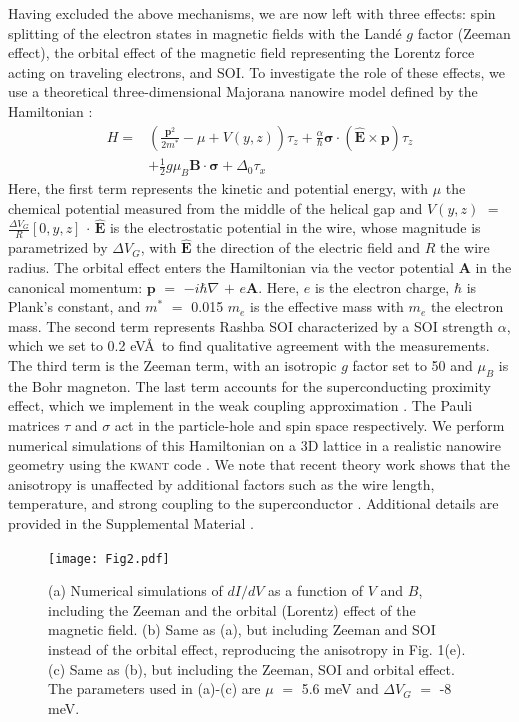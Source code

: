 Having excluded the above mechanisms, we are now left with three effects: spin splitting of the electron \mbox{states} in magnetic fields with the Land\'e $g$ factor (Zeeman eff\mbox{ect)}, the orbital effect of the magnetic field representing the Lorentz force acting on traveling electrons, and SOI.
To investigate the role of these effects, we use a theoretical three-dimensional Majorana nanowire model defined by the Hamiltonian \cite{Lutchyn2010,Oreg2010,Nijholt2016}:
\begin{equation*}
\begin{split}
H = &\left(\frac{\mathbf{p}^2}{2m^*}-\mu+V(y,z)\right) \tau_z + \frac{\alpha}{\hbar} \boldsymbol{\sigma} \cdot \mathbf{(\hat{E}\times p)} \tau_z\\
&+ \frac{1}{2}g\mu_B\mathbf{B\cdot}\boldsymbol{\sigma}+\Delta_0 \tau_x
\end{split}
\end{equation*}
Here, the first term represents the kinetic and potential energy, with $\mu$ the chemical potential measured from the middle of the helical gap and $V(y,z)$ $=$ $\frac{\Delta V_G}{R}[0,y,z]$ $\cdot$ $\mathbf{\hat{E}}$ is the electrostatic potential in the wire, whose magnitude is parametrized by $\Delta V_G$, with $\mathbf{\hat{E}}$ the direction of the electric field and $R$ the wire radius.
The orbital effect enters the Hamiltonian via the vector potential $\mathbf{A}$ in the canonical momentum: $\mathbf{p}$ $=$ $-i\hbar \nabla$ $+$ $e\mathbf{A}$.
Here, $e$ is the electron charge, $\hbar$ is Plank's constant, and $m^*$ $=$ 0.015 $m_e$ is the effective mass with $m_e$ the electron mass.
The second term represents Rashba SOI characterized by a SOI strength $\alpha$, which we set to 0.2 eV\AA\ to find qualitative agreement with the measurements.
The third term is the Zeeman term, with an isotropic $g$ factor set to 50 and $\mu_B$ is the Bohr magneton.
The last term accounts for the superconducting proximity effect, which we implement in the weak coupling approximation \cite{Nijholt2016}.
The Pauli matrices $\tau$ and $\sigma$ act in the particle-hole and spin space respectively.
We perform numerical simulations of this Hamiltonian on a 3D lattice in a realistic nanowire geometry using the \textsc{kwant} code \cite{Groth2014}.
We note that recent theory work shows that the anisotropy is unaffected by additional factors such as the wire length, temperature, and strong coupling to the superconductor \cite{Liu2019}.
Additional details are provided in the Supplemental Material \cite{Note1}.
\begin{figure}
\texttt{[image: Fig2.pdf]}
\caption{\label{fig2}
(a) Numerical simulations of $dI/dV$ as a function of $V$ and $B$, including the Zeeman and the orbital (Lorentz) effect of the magnetic field.
(b) Same as (a), but including Zeeman and SOI instead of the orbital effect, reproducing the anisotropy in Fig. 1(e).
(c) Same as (b), but including the Zeeman, SOI and orbital effect.
The parameters used in (a)-(c) are $\mu$ $=$ 5.6 meV and $\Delta V_G$ $=$ -8 meV.
}
\end{figure}

